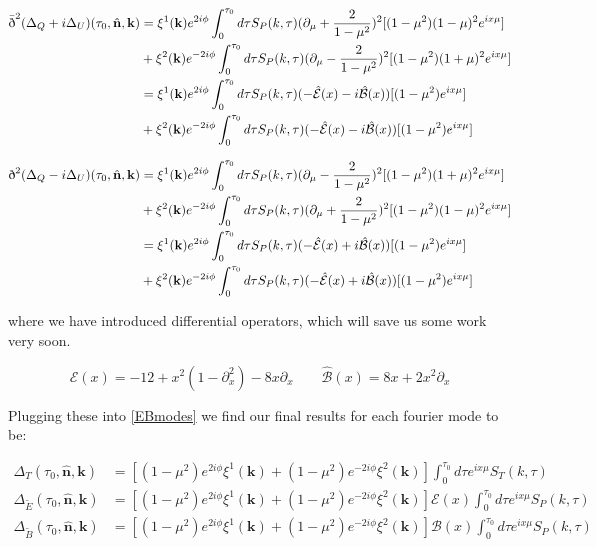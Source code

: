 \documentclass[a4paper,10pt]{article}
\renewcommand{\v}[1]{\mathbf{#1}}
\newcommand{\unit}[1]{\hat{\v{#1}}}
\newcommand{\sr}{\text{\normalfont\dh}}
\renewcommand{\sl}{\bar{\text{\normalfont\dh}}}
\begin{document}
\begin{equation}\begin{split}
\sl^2(\Delta_Q+i\Delta_U)(\tau_0,\unit{n},\v{k}) &= \xi^1(\v{k})e^{2i\phi}\int_0^{\tau_0}d\tau S_P(k,\tau)(\partial_\mu+\frac{2}{1-\mu^2})^2[(1-\mu^2)(1-\mu)^2 e^{ix\mu}]\\
&{} + \xi^2(\v{k})e^{-2i\phi}\int_0^{\tau_0}d\tau S_P(k,\tau)(\partial_\mu-\frac{2}{1-\mu^2})^2[(1-\mu^2)(1+\mu)^2 e^{ix\mu}]\\
&= \xi^1(\v{k})e^{2i\phi}\int_0^{\tau_0}d\tau S_P(k,\tau)(-\hat{\mathcal{E}}(x)-i\hat{\mathcal{B}}(x))[(1-\mu^2) e^{ix\mu}] \\
&{} + \xi^2(\v{k})e^{-2i\phi}\int_0^{\tau_0}d\tau S_P(k,\tau)(-\hat{\mathcal{E}}(x)-i\hat{\mathcal{B}}(x))[(1-\mu^2) e^{ix\mu}] 
\end{split}\end{equation}

\begin{equation}\begin{split}
\sr^2(\Delta_Q-i\Delta_U)(\tau_0,\unit{n},\v{k}) &= \xi^1(\v{k})e^{2i\phi}\int_0^{\tau_0}d\tau S_P(k,\tau)(\partial_\mu-\frac{2}{1-\mu^2})^2[(1-\mu^2)(1+\mu)^2 e^{ix\mu}] \\ 
&{} + \xi^2(\v{k})e^{-2i\phi}\int_0^{\tau_0}d\tau S_P(k,\tau)(\partial_\mu+\frac{2}{1-\mu^2})^2[(1-\mu^2)(1-\mu)^2 e^{ix\mu}]\\
&= \xi^1(\v{k})e^{2i\phi}\int_0^{\tau_0}d\tau S_P(k,\tau)(-\hat{\mathcal{E}}(x)+i\hat{\mathcal{B}}(x))[(1-\mu^2) e^{ix\mu}] \\
&{} + \xi^2(\v{k})e^{-2i\phi}\int_0^{\tau_0}d\tau S_P(k,\tau)(-\hat{\mathcal{E}}(x)+i\hat{\mathcal{B}}(x))[(1-\mu^2) e^{ix\mu}] 
\end{split}\end{equation}

where we have introduced differential operators, which will save us some work very soon.

\begin{equation}
\hat{\mathcal{E}}(x)=-12+x^2(1-\partial^2_x)-8x\partial_x \qquad \mathcal{\hat{B}}(x) = 8x+2x^2\partial_x
\end{equation}

Plugging these into \ref{EBmodes} we find our final results for each fourier mode to be:

\begin{equation}\begin{split}
\Delta_T(\tau_0,\unit{n},\v{k}) &= [(1-\mu^2) e^{2i\phi} \xi^1(\v{k})+(1-\mu^2) e^{-2i\phi} \xi^2(\v{k})]\int_0^{\tau_0}d\tau e^{ix\mu}S_T(k,\tau)\\
\Delta_{\tilde{E}}(\tau_0,\unit{n},\v{k}) &= [(1-\mu^2) e^{2i\phi} \xi^1(\v{k})+(1-\mu^2) e^{-2i\phi} \xi^2(\v{k})]\mathcal{E}(x)\int_0^{\tau_0}d\tau e^{ix\mu}S_P(k,\tau)\\
\Delta_{\tilde{B}}(\tau_0,\unit{n},\v{k}) &= [(1-\mu^2) e^{2i\phi} \xi^1(\v{k})+(1-\mu^2) e^{-2i\phi} \xi^2(\v{k})]\mathcal{B}(x)\int_0^{\tau_0}d\tau e^{ix\mu}S_P(k,\tau)
\label{LoSfourier}
\end{split}\end{equation}
\end{document}
